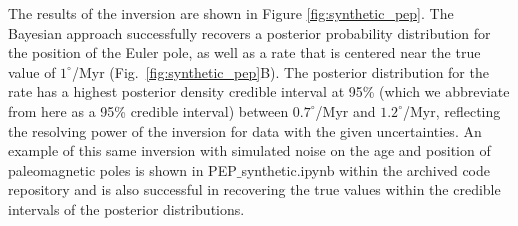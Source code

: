 \documentclass[11pt,letterpaper]{article}
\begin{document}
The results of the inversion are shown in Figure \ref{fig:synthetic_pep}. The Bayesian approach successfully recovers a posterior probability distribution for the position of the Euler pole, as well as a rate that is centered near the true value of $1^\circ$/Myr (Fig.~\ref{fig:synthetic_pep}B). The posterior distribution for the rate has a highest posterior density credible interval at 95\% (which we abbreviate from here as a 95\% credible interval) between $0.7^\circ$/Myr and $1.2^\circ$/Myr, reflecting the resolving power of the inversion for data with the given uncertainties. An example of this same inversion with simulated noise on the age and position of paleomagnetic poles is shown in PEP$\_$synthetic.ipynb within the archived code repository and is also successful in recovering the true values within the credible intervals of the posterior distributions.
\end{document}
